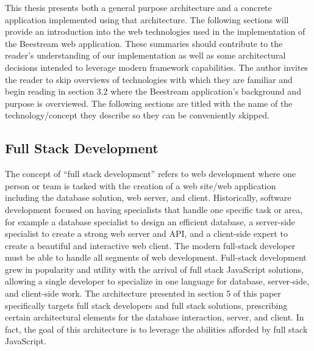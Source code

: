 %
%

This thesis presents both a general purpose architecture and a concrete application implemented using that architecture.  The following sections will provide an introduction into the web technologies used in the implementation of the Beestream web application.  These summaries should contribute to the reader’s understanding of our implementation as well as some architectural decisions intended to leverage modern framework capabilities.  The author invites the reader to skip overviews of technologies with which they are familiar and begin reading in section 3.2 where the Beestream application’s background and purpose is overviewed.  The following sections are titled with the name of the technology/concept they describe so they can be conveniently skipped. \par

\subsection{Full Stack Development}
The concept of “full stack development” refers to web development where one person or team is tasked with the creation of a web site/web application including the database solution, web server, and client. Historically, software development focused on having specialists that handle one specific task or area, for example a database specialist to design an efficient database, a server-side specialist to create a strong web server and API, and a client-side expert to create a beautiful and interactive web client.  The modern full-stack developer must be able to handle all segments of web development.  Full-stack development grew in popularity and utility with the arrival of full stack JavaScript solutions, allowing a single developer to specialize in one language for database, server-side, and client-side work.  The architecture presented in section 5 of this paper specifically targets full stack developers and full stack solutions, prescribing certain architectural elements for the database interaction, server, and client.  In fact, the goal of this architecture is to leverage the abilities afforded by full stack JavaScript. \par

